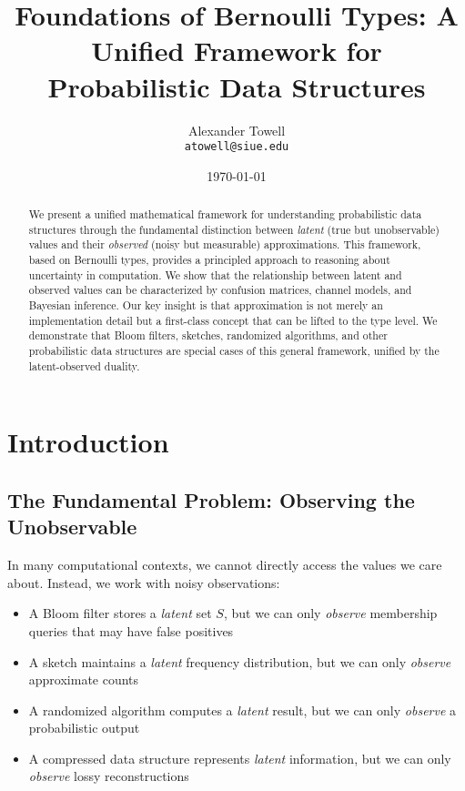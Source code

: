 \documentclass[11pt,final,hidelinks]{article}
\title{Foundations of Bernoulli Types: A Unified Framework for Probabilistic Data Structures}
\author{
    Alexander Towell\\
    \texttt{atowell@siue.edu}
}
\date{\today}
\begin{document}
\maketitle
\NotationSection

\begin{abstract}
We present a unified mathematical framework for understanding probabilistic data structures through the fundamental distinction between \emph{latent} (true but unobservable) values and their \emph{observed} (noisy but measurable) approximations. This framework, based on Bernoulli types, provides a principled approach to reasoning about uncertainty in computation. We show that the relationship between latent and observed values can be characterized by confusion matrices, channel models, and Bayesian inference. Our key insight is that approximation is not merely an implementation detail but a first-class concept that can be lifted to the type level. We demonstrate that Bloom filters, sketches, randomized algorithms, and other probabilistic data structures are special cases of this general framework, unified by the latent-observed duality.
\end{abstract}

\section{Introduction}

\subsection{The Fundamental Problem: Observing the Unobservable}

In many computational contexts, we cannot directly access the values we care about. Instead, we work with noisy observations:

\begin{itemize}
    \item A Bloom filter stores a \emph{latent} set $S$, but we can only \emph{observe} membership queries that may have false positives
    \item A sketch maintains a \emph{latent} frequency distribution, but we can only \emph{observe} approximate counts
    \item A randomized algorithm computes a \emph{latent} result, but we can only \emph{observe} a probabilistic output
    \item A compressed data structure represents \emph{latent} information, but we can only \emph{observe} lossy reconstructions
\end{itemize}
\end{document}
